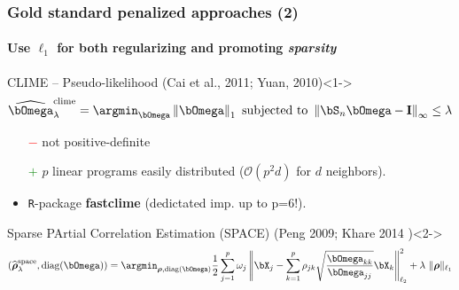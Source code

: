 \begin{frame}
  \frametitle{Gold standard penalized approaches (2)}
  \framesubtitle{Use $\ell_1$ for both regularizing and promoting \textit{sparsity}}

  \begin{overlayarea}{\textwidth}{\textheight}

    \begin{block}{CLIME -- Pseudo-likelihood  (Cai et al., 2011;
        Yuan, 2010)}<1->
      \vspace*{-1.5em}
      \begin{equation*}
        \widehat{\invcov}^{\text{clime}}_\lambda  = \argmin_{\invcov}
        \left\|   \invcov \right\|_1 \text{ subjected to }
        \left\|   \empcov \invcov - \mathbf{I} \right\|_\infty\leq \lambda
      \end{equation*}
      \vspace*{-1.5em}
    \end{block}

    \begin{itemize}
    \item[\textcolor{red}{$-$}] not positive-definite
    \item[\textcolor{green}{$+$}]  $p$ linear  programs easily
      distributed ($\mathcal{O}(p^2d)$ for $d$ neighbors).
    \item \texttt{R}-package \textbf{fastclime} (dedictated imp. up to p=6!).
    \end{itemize}

      \vspace*{-.5em}

    \begin{block}{Sparse PArtial  Correlation Estimation (SPACE)
        (Peng 2009; Khare 2014 )}<2->
      \vspace*{-2em}
      \begin{equation*}
        \left(\widehat{\boldsymbol\rho}_\lambda^{\text{space}}, \mathrm{diag}({\boldsymbol\invcov})\right) =
        \argmin_{\boldsymbol\rho,\mathrm{diag}({\boldsymbol\invcov})} \frac{1}{2}
        \sum_{j=1}^p \omega_j \left\|
          \bX_j - \sum_{k=1}^p \rho_{jk} \sqrt{\frac{{\invcov}_{kk}}{{\invcov}_{jj}}}
          \bX_k \right\|_{\ell_2}^2 + \lambda\ \| \boldsymbol\rho \|_{\ell_1}
      \end{equation*}
      \vspace*{-1.5em}
    \end{block}


\end{overlayarea}

\end{frame}

